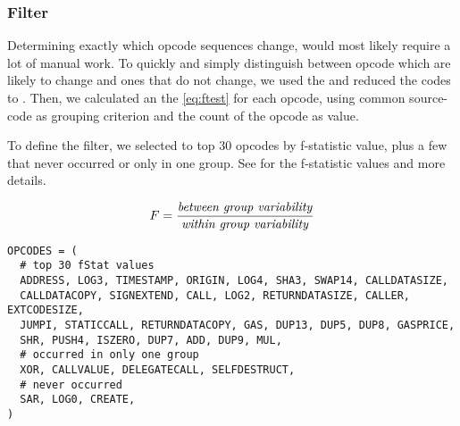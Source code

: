 \documentclass[../main.tex]{subfiles}
\begin{document}
\subsubsection{ Filter \label{sec:fStat}}
Determining exactly which opcode sequences change, would most likely require a lot of manual work.
To quickly and simply distinguish between opcode which are likely to change and ones that do not change, we used the \n{\solcts}  and reduced the codes to  . Then, we calculated an the  \eqref{eq:ftest} for each opcode, using common source-code as grouping criterion and the count of the opcode as value.

To define the  filter, we selected to top 30 opcodes by f-statistic value, plus a few that never occurred or only in one group. See  for the f-statistic values and more details.

\begin{equation}
  F = \dfrac{\mbox{\textit{between group variability}}}{\mbox{\textit{within group variability}}}
  \label{eq:ftest}
\end{equation}

\begin{lstlisting}[style=pymd]
OPCODES = (
  # top 30 fStat values
  ADDRESS, LOG3, TIMESTAMP, ORIGIN, LOG4, SHA3, SWAP14, CALLDATASIZE,
  CALLDATACOPY, SIGNEXTEND, CALL, LOG2, RETURNDATASIZE, CALLER, EXTCODESIZE,
  JUMPI, STATICCALL, RETURNDATACOPY, GAS, DUP13, DUP5, DUP8, GASPRICE,
  SHR, PUSH4, ISZERO, DUP7, ADD, DUP9, MUL,
  # occurred in only one group
  XOR, CALLVALUE, DELEGATECALL, SELFDESTRUCT,
  # never occurred
  SAR, LOG0, CREATE,
)
\end{lstlisting}
\end{document}
